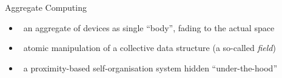 \documentclass[8pt, aspectratio=169, handout]{beamer}
\begin{document}
\begin{frame}{Aggregate Computing}
  \begin{card}
    \begin{itemize}
      \item {}
      \faArrowRight \, an aggregate of devices as single ``body'', fading to the actual space
      \item {}
      \faArrowRight \,  atomic manipulation of a collective data structure (a so-called \emph{field})
      \item {}
      \faArrowRight \, a proximity-based self-organisation system hidden “under-the-hood”
    \end{itemize}
  \end{card}
  \centering
\end{frame}
\end{document}
